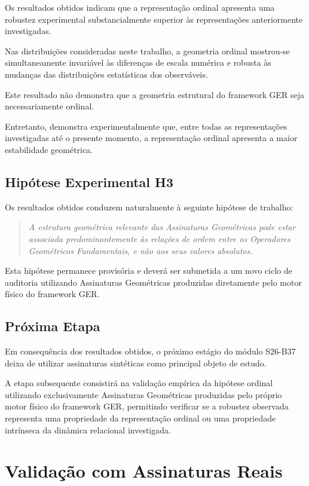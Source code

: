 \documentclass[11pt,a4paper]{article}
\begin{document}
Os resultados obtidos indicam que a representação ordinal apresenta uma
robustez experimental substancialmente superior às representações
anteriormente investigadas.

Nas distribuições consideradas neste trabalho, a geometria ordinal mostrou-se
simultaneamente invariável às diferenças de escala numérica e robusta às
mudanças das distribuições estatísticas dos observáveis.

Este resultado não demonstra que a geometria estrutural do framework GER
seja necessariamente ordinal.

Entretanto, demonstra experimentalmente que, entre todas as representações
investigadas até o presente momento, a representação ordinal apresenta a
maior estabilidade geométrica.

\subsection{Hipótese Experimental H3}

Os resultados obtidos conduzem naturalmente à seguinte hipótese de trabalho:

\begin{quote}
\emph{A estrutura geométrica relevante das Assinaturas Geométricas pode
estar associada predominantemente às relações de ordem entre os
Operadores Geométricos Fundamentais, e não aos seus valores absolutos.}
\end{quote}

Esta hipótese permanece provisória e deverá ser submetida a um novo ciclo
de auditoria utilizando Assinaturas Geométricas produzidas diretamente
pelo motor físico do framework GER.

\subsection{Próxima Etapa}

Em consequência dos resultados obtidos, o próximo estágio do módulo
S26-B37 deixa de utilizar assinaturas sintéticas como principal objeto de
estudo.

A etapa subsequente consistirá na validação empírica da hipótese ordinal
utilizando exclusivamente Assinaturas Geométricas produzidas pelo próprio
motor físico do framework GER, permitindo verificar se a robustez
observada representa uma propriedade da representação ordinal ou uma
propriedade intrínseca da dinâmica relacional investigada.

\section{Validação com Assinaturas Reais}
\end{document}
